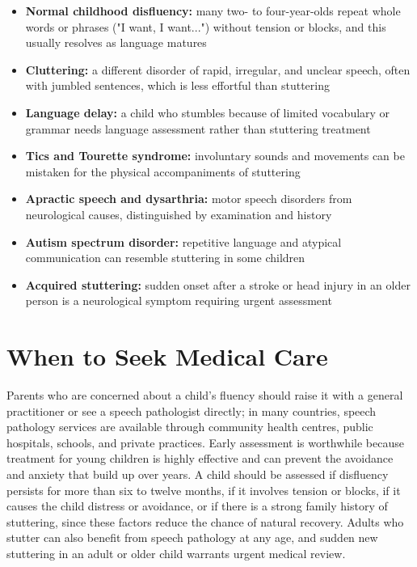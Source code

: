 \begin{itemize}
    \item \textbf{Normal childhood disfluency:} many two- to four-year-olds repeat whole words or phrases ("I want, I want...") without tension or blocks, and this usually resolves as language matures
    \item \textbf{Cluttering:} a different disorder of rapid, irregular, and unclear speech, often with jumbled sentences, which is less effortful than stuttering
    \item \textbf{Language delay:} a child who stumbles because of limited vocabulary or grammar needs language assessment rather than stuttering treatment
    \item \textbf{Tics and Tourette syndrome:} involuntary sounds and movements can be mistaken for the physical accompaniments of stuttering
    \item \textbf{Apractic speech and dysarthria:} motor speech disorders from neurological causes, distinguished by examination and history
    \item \textbf{Autism spectrum disorder:} repetitive language and atypical communication can resemble stuttering in some children
    \item \textbf{Acquired stuttering:} sudden onset after a stroke or head injury in an older person is a neurological symptom requiring urgent assessment
\end{itemize}

\section*{When to Seek Medical Care}
Parents who are concerned about a child's fluency should raise it with a general practitioner or see a speech pathologist directly; in many countries, speech pathology services are available through community health centres, public hospitals, schools, and private practices. Early assessment is worthwhile because treatment for young children is highly effective and can prevent the avoidance and anxiety that build up over years. A child should be assessed if disfluency persists for more than six to twelve months, if it involves tension or blocks, if it causes the child distress or avoidance, or if there is a strong family history of stuttering, since these factors reduce the chance of natural recovery. Adults who stutter can also benefit from speech pathology at any age, and sudden new stuttering in an adult or older child warrants urgent medical review.

